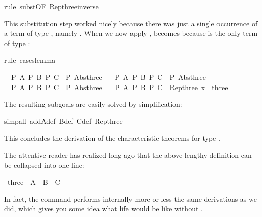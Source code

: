 \begin{isabellebody}
\begin{isamarkuptxt}
\end{isamarkuptxt}%
rule\ subst{\isacharbrackleft}OF\ Rep{\isacharunderscore}three{\isacharunderscore}inverse{\isacharbrackright}{\isacharparenright}%
\begin{isamarkuptxt}%
\noindent
This substitution step worked nicely because there was just a single
occurrence of a term of type , namely .
When we now apply ,  becomes  because  is the only term of type :%
\end{isamarkuptxt}%
rule\ cases{\isacharunderscore}lemma{\isacharparenright}%
\begin{isamarkuptxt}%
\begin{isabelle}%
\ {}{\isachardot}\ {\isasymlbrakk}P\ A{\isacharsemicolon}\ P\ B{\isacharsemicolon}\ P\ C{\isasymrbrakk}\ {\isasymLongrightarrow}\ P\ {\isacharparenleft}Abs{\isacharunderscore}three\ {}{\isacharparenright}\isanewline
\ {}{\isachardot}\ {\isasymlbrakk}P\ A{\isacharsemicolon}\ P\ B{\isacharsemicolon}\ P\ C{\isasymrbrakk}\ {\isasymLongrightarrow}\ P\ {\isacharparenleft}Abs{\isacharunderscore}three\ {}{\isacharparenright}\isanewline
\ {}{\isachardot}\ {\isasymlbrakk}P\ A{\isacharsemicolon}\ P\ B{\isacharsemicolon}\ P\ C{\isasymrbrakk}\ {\isasymLongrightarrow}\ P\ {\isacharparenleft}Abs{\isacharunderscore}three\ {}{\isacharparenright}\isanewline
\ {}{\isachardot}\ {\isasymlbrakk}P\ A{\isacharsemicolon}\ P\ B{\isacharsemicolon}\ P\ C{\isasymrbrakk}\ {\isasymLongrightarrow}\ Rep{\isacharunderscore}three\ x\ {\isasymin}\ three%
\end{isabelle}
The resulting subgoals are easily solved by simplification:%
\end{isamarkuptxt}%
simp{\isacharunderscore}all\ add{\isacharcolon}A{\isacharunderscore}def\ B{\isacharunderscore}def\ C{\isacharunderscore}def\ Rep{\isacharunderscore}three{\isacharparenright}\isanewline
{}%
\begin{isamarkuptext}%
\noindent
This concludes the derivation of the characteristic theorems for
type .

The attentive reader has realized long ago that the
above lengthy definition can be collapsed into one line:%
\end{isamarkuptext}%
\ three{\isacharprime}\ {\isacharequal}\ A\ {\isacharbar}\ B\ {\isacharbar}\ C%
\begin{isamarkuptext}%
\noindent
In fact, the  command performs internally more or less
the same derivations as we did, which gives you some idea what life would be
like without .


\end{isamarkuptext}
\end{isabellebody}
